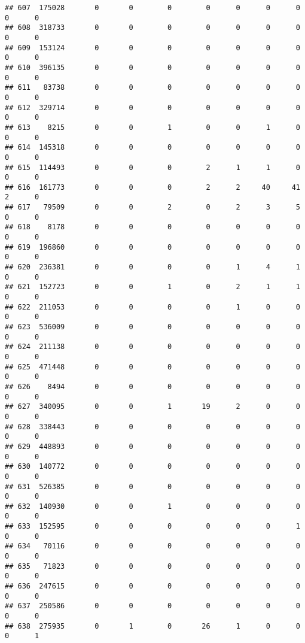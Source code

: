 \documentclass[
]{article}
\begin{document}
\begin{verbatim}
## 607  175028       0       0        0        0      0      0      0     0      0
## 608  318733       0       0        0        0      0      0      0     0      0
## 609  153124       0       0        0        0      0      0      0     0      0
## 610  396135       0       0        0        0      0      0      0     0      0
## 611   83738       0       0        0        0      0      0      0     0      0
## 612  329714       0       0        0        0      0      0      0     0      0
## 613    8215       0       0        1        0      0      1      0     0      0
## 614  145318       0       0        0        0      0      0      0     0      0
## 615  114493       0       0        0        2      1      1      0     0      0
## 616  161773       0       0        0        2      2     40     41     2      0
## 617   79509       0       0        2        0      2      3      5     0      0
## 618    8178       0       0        0        0      0      0      0     0      0
## 619  196860       0       0        0        0      0      0      0     0      0
## 620  236381       0       0        0        0      1      4      1     0      0
## 621  152723       0       0        1        0      2      1      1     0      0
## 622  211053       0       0        0        0      1      0      0     0      0
## 623  536009       0       0        0        0      0      0      0     0      0
## 624  211138       0       0        0        0      0      0      0     0      0
## 625  471448       0       0        0        0      0      0      0     0      0
## 626    8494       0       0        0        0      0      0      0     0      0
## 627  340095       0       0        1       19      2      0      0     0      0
## 628  338443       0       0        0        0      0      0      0     0      0
## 629  448893       0       0        0        0      0      0      0     0      0
## 630  140772       0       0        0        0      0      0      0     0      0
## 631  526385       0       0        0        0      0      0      0     0      0
## 632  140930       0       0        1        0      0      0      0     0      0
## 633  152595       0       0        0        0      0      0      1     0      0
## 634   70116       0       0        0        0      0      0      0     0      0
## 635   71823       0       0        0        0      0      0      0     0      0
## 636  247615       0       0        0        0      0      0      0     0      0
## 637  250586       0       0        0        0      0      0      0     0      0
## 638  275935       0       1        0       26      1      0      0     0      1

\end{verbatim}
\end{document}

